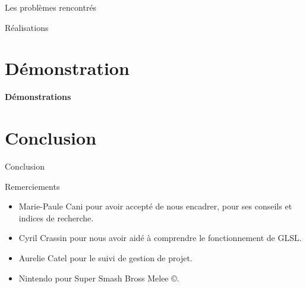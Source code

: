 \documentclass{beamer}
\begin{document}
\begin{frame}{Les problèmes rencontrés}
\end{frame}

\begin{frame}{Réalisations}
\end{frame}

\section{Démonstration}
\begin{frame}
  \begin{center}
    \textbf{Démonstrations}
  \end{center}
\end{frame}

\section{Conclusion}
\begin{frame}{Conclusion}
\end{frame}

\begin{frame}{Remerciements}
  \begin{itemize}
  \item{Marie-Paule Cani} pour avoir accepté de nous encadrer, pour
    ses conseils et indices de recherche.
  \item{Cyril Crassin} pour nous avoir aidé à comprendre le
    fonctionnement de GLSL.
  \item{Aurelie Catel} pour le suivi de gestion de projet.
  \item{Nintendo\texttrademark} pour Super Smash Bross Melee ©.
  \end{itemize}
\end{frame}
\end{document}
